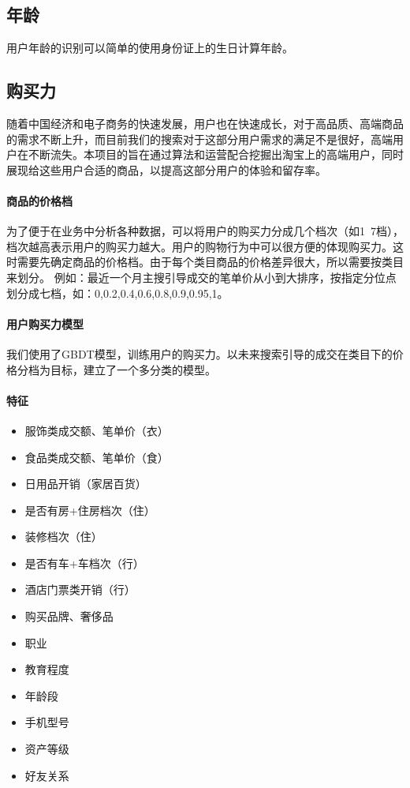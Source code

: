 	\subsection{年龄}
	用户年龄的识别可以简单的使用身份证上的生日计算年龄。
	\subsection{购买力}
	随着中国经济和电子商务的快速发展，用户也在快速成长，对于高品质、高端商品的需求不断上升，而目前我们的搜索对于这部分用户需求的满足不是很好，高端用户在不断流失。本项目的旨在通过算法和运营配合挖掘出淘宝上的高端用户，同时展现给这些用户合适的商品，以提高这部分用户的体验和留存率。
	\paragraph{商品的价格档}
	为了便于在业务中分析各种数据，可以将用户的购买力分成几个档次（如1~7档），档次越高表示用户的购买力越大。用户的购物行为中可以很方便的体现购买力。这时需要先确定商品的价格档。由于每个类目商品的价格差异很大，所以需要按类目来划分。
	例如：最近一个月主搜引导成交的笔单价从小到大排序，按指定分位点划分成七档，如：0,0.2,0.4,0.6,0.8,0.9,0.95,1。
	\paragraph{用户购买力模型}
	我们使用了GBDT模型，训练用户的购买力。以未来搜索引导的成交在类目下的价格分档为目标，建立了一个多分类的模型。
	\paragraph{特征}
	\begin{itemize}
		\item{服饰类成交额、笔单价（衣）}
		\item{食品类成交额、笔单价（食）}
		\item{日用品开销（家居百货）}
		\item{是否有房+住房档次（住）}
		\item{装修档次（住）}
		\item{是否有车+车档次（行）}
		\item{酒店门票类开销（行）}
		\item{购买品牌、奢侈品}
		\item{职业}
		\item{教育程度}
		\item{年龄段}
		\item{手机型号}
		\item{资产等级}
		\item{好友关系}
	\end{itemize}
